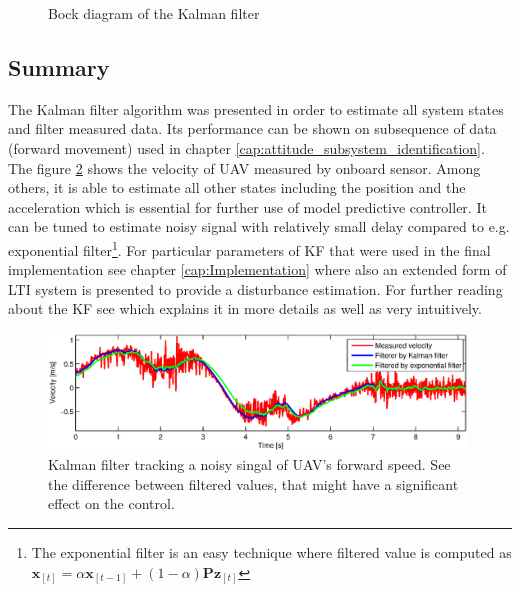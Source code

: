 \begin{figure}
\caption{Bock diagram of the Kalman filter}
\label{fig:kalman_diagram}
\end{figure}

\subsection{Summary}

The Kalman filter algorithm was presented in order to estimate all system states and filter measured data. Its performance can be shown on subsequence of data (forward movement) used in chapter \ref{cap:attitude_subsystem_identification}. The figure \ref{fig:kalman1} shows the velocity of UAV measured by onboard sensor. Among others, it is able to estimate all other states including the position and the acceleration which is essential for further use of model predictive controller. It can be tuned to estimate noisy signal with relatively small delay compared to e.g. exponential filter\footnote{The exponential filter is an easy technique where filtered value is computed as $\textbf{\^x}_{[t]} = \alpha\textbf{\^x}_{[t-1]} + (1-\alpha)\textbf{P}\textbf{z}_{[t]}$}. For particular parameters of KF that were used in the final implementation see chapter \ref{cap:Implementation} where also an extended form of LTI system is presented to provide a disturbance estimation. For further reading about the KF see \citep{faragher2012understandingKF} which explains it in more details as well as very intuitively.

\begin{figure}[h]
\includegraphics[width=0.99\textwidth]{fig/kalman1.eps} 
\caption{Kalman filter tracking a noisy singal of UAV's forward speed. See the difference between filtered values, that might have a significant effect on the control.}
\label{fig:kalman1}
\end{figure}